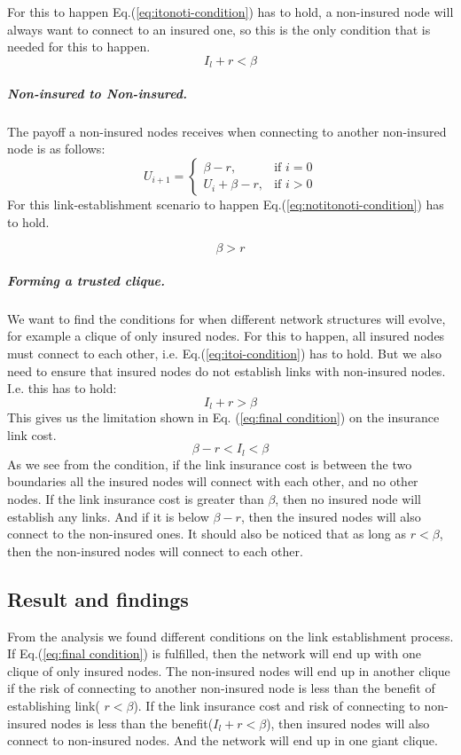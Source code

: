 For this to happen Eq.(\ref{eq:itonoti-condition}) has to hold, a non-insured node will always want to connect to an insured one, so this is the only condition that is needed for this to happen.
\begin{equation}
I_{l}+r<\beta
\label{eq:itonoti-condition}
\end{equation}
\subparagraph{Non-insured to Non-insured.}
The payoff a non-insured nodes receives when connecting to another non-insured node is as follows:
\begin{equation}
    U_{i+1}= 
\begin{cases}
    \beta -r,& \text{if } i = 0\\
    U_{i}+\beta -r,& \text{if }  i>0
   
\end{cases}
\label{eq:notitonotimodel2}
\end{equation}
For this link-establishment scenario to happen Eq.(\ref{eq:notitonoti-condition}) has to hold.

\begin{equation}
\beta>r
\label{eq:notitonoti-condition}
\end{equation}

\subparagraph{Forming a trusted clique.}
We want to find the conditions for when different network structures will evolve, for example a clique of only insured nodes. For this to happen, all insured nodes must connect to each other, i.e. Eq.(\ref{eq:itoi-condition}) has to hold. But we also need to ensure that insured nodes do not establish links with non-insured nodes. I.e. this has to hold:
\begin{equation}
I_{l}+r>\beta
\end{equation}
This gives us the limitation shown in Eq. (\ref{eq:final condition}) on the insurance link cost.
\begin{equation}
\beta-r<I_{l}<\beta
\label{eq:final condition}
\end{equation}
As we see from the condition, if the link insurance cost is between the two boundaries all the insured nodes will connect with each other, and no other nodes. If the link insurance cost is greater than $\beta$, then no insured node will establish any links. And if it is below $\beta-r$, then the insured nodes will also connect to the non-insured ones.
It should also be noticed that as long as $r<\beta$, then the non-insured nodes will connect to each other. 

\subsection{Result and findings}
From the analysis we found different conditions on the link establishment process. If Eq.(\ref{eq:final condition}) is fulfilled, then the network will end up with one clique of only insured nodes. The non-insured nodes will end up in another clique if the risk of connecting to another non-insured node is less than the benefit of establishing link( $r<\beta$).
If the link insurance cost and risk of connecting to non-insured nodes is less than the benefit($I_{l}+r<\beta$), then insured nodes will also connect to non-insured nodes. And the network will end up in one giant clique.

